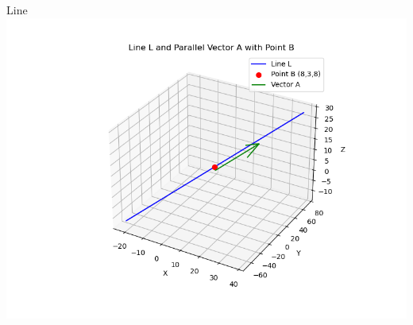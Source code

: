 \documentclass{beamer}
\begin{document}
\begin{frame}{Line}
   \centering
    \includegraphics[width=\columnwidth, height=0.8\textheight, keepaspectratio]{figs/fig1.png}
    \label{fig:Beamer/figs/fig1.png}
\end{frame}
\end{document}
